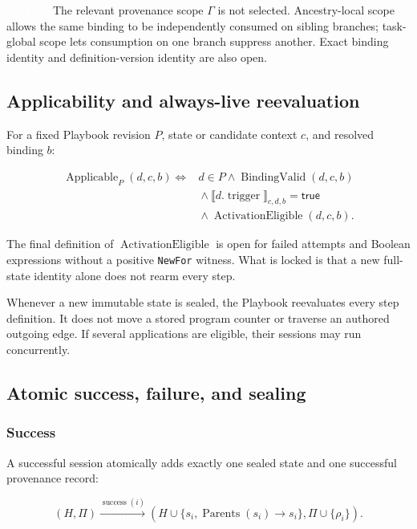 \documentclass[11pt]{article}
\newcommand{\statuspill}[2]{%
  \begingroup\setlength{\fboxsep}{3pt}%
  \colorbox{#1}{\textcolor{white}{\sffamily\bfseries\scriptsize #2}}%
  \endgroup}
\newcommand{\Open}{\statuspill{Amber}{OPEN}}
\newcommand{\artifact}[1]{\texttt{#1}}
\begin{document}
\Open\ The relevant provenance scope \(\Gamma\) is not selected. Ancestry-local scope allows the same binding to be independently consumed on sibling branches; task-global scope lets consumption on one branch suppress another. Exact binding identity and definition-version identity are also open.

\subsection{Applicability and always-live reevaluation}

For a fixed Playbook revision \(P\), state or candidate context \(c\), and resolved binding \(b\):

\begin{equation}
\begin{aligned}
  \operatorname{Applicable}_P(d,c,b) \iff{}&
  d\in P \land \operatorname{BindingValid}(d,c,b) \\
  &{}\land \llbracket d.\operatorname{trigger}\rrbracket_{c,d,b}=\mathsf{true} \\
  &{}\land \operatorname{ActivationEligible}(d,c,b).
\end{aligned}
\end{equation}

The final definition of \(\operatorname{ActivationEligible}\) is open for failed attempts and Boolean expressions without a positive \artifact{NewFor} witness. What is locked is that a new full-state identity alone does not rearm every step.

Whenever a new immutable state is sealed, the Playbook reevaluates every step definition. It does not move a stored program counter or traverse an authored outgoing edge. If several applications are eligible, their sessions may run concurrently.

\subsection{Atomic success, failure, and sealing}

\subsubsection{Success}

A successful session atomically adds exactly one sealed state and one successful provenance record:

\begin{equation}
  (H,\Pi) \xrightarrow{\operatorname{success}(i)}
  (H\cup\{s_i,\operatorname{Parents}(s_i)\to s_i\},
   \Pi\cup\{\rho_i\}).
\end{equation}
\end{document}
